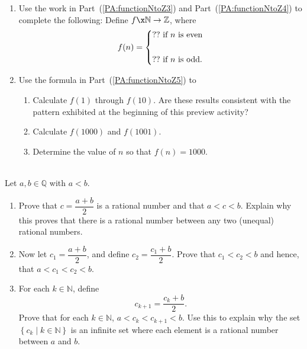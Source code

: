 \begin{previewactivity}
\begin{enumerate}
\item Use the work in Part~(\ref{PA:functionNtoZ3}) and Part~(\ref{PA:functionNtoZ4}) to complete the following:  Define $f\x \mathbb{N} \to \mathbb{Z}$, where
\[
f ( n ) = \left\{ \begin{gathered}
  ?? \text{  if  }n \text{ is even} \hfill \\
\\
  ?? \text{  if  }n \text{ is odd}. \hfill \\ 
\end{gathered}  \right.
\]
\label{PA:functionNtoZ5}%

\item Use the formula in Part~(\ref{PA:functionNtoZ5}) to
\begin{enumerate}
\item Calculate $f ( 1 )$ through $f ( 10 )$.  Are these results consistent with the pattern exhibited at the beginning of this preview activity?

\item Calculate $f ( 1000 )$ and $f ( 1001 )$.

\item Determine the value of $n$ so that $f ( n ) = 1000$.
\end{enumerate}
\end{enumerate} 
\end{previewactivity}
\hbreak

\begin{previewactivity}\label{PA:between2rationals} \hfill \\
Let $a, b \in \mathbb{Q}$ with $a < b$.
\begin{enumerate}
\item Prove that $c = \dfrac{a+b}{2}$ is a rational number and that $a < c < b$.  Explain why this proves that there is a rational number between any two (unequal) rational numbers.

\item Now let  $c_1 = \dfrac{a+b}{2}$, and define $c_2 = \dfrac{c_1 + b}{2}$.  Prove that 
$c_1 < c_2 < b$ and hence, that $a < c_1 < c_2 < b$.


\item For each $k \in \mathbb{N}$, define
\[
c_{k+1} = \frac{c_k + b}{2}.
\]
Prove that for each $k \in \mathbb{N}$, $a < c_k < c_{k+1} < b$.  Use this to explain why the set 
$\left\{ c_k \mid k \in \mathbb{N} \right\}$ is an infinite set where each element is a rational number between $a$ and $b$.
\end{enumerate}
\end{previewactivity}
\hbreak



\endinput
